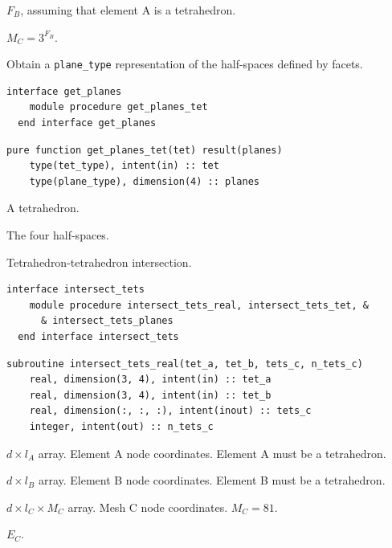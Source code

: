 \documentclass{article}
\begin{document}
\begin{description}[font=\ttfamily\bfseries,leftmargin=2.2\parindent,labelindent=1.7\parindent,noitemsep]
  \item[n\_planes\_b] $F_B$, assuming that element A is a tetrahedron.
  \item[max\_n\_tets\_c] $M_C = 3^{F_B}$.
\end{description}

\noindent Obtain a \verb+plane_type+ representation of the half-spaces defined
by facets.

\begin{lstlisting}[language=FORTRAN]
  interface get_planes
    module procedure get_planes_tet
  end interface get_planes
\end{lstlisting}
  
\begin{lstlisting}[language=FORTRAN]
  pure function get_planes_tet(tet) result(planes)
    type(tet_type), intent(in) :: tet
    type(plane_type), dimension(4) :: planes
\end{lstlisting}

\begin{description}[font=\ttfamily\bfseries,leftmargin=2.2\parindent,labelindent=1.7\parindent,noitemsep]
  \item[tet] A tetrahedron.
  \item[plane] The four half-spaces.
\end{description}

\noindent Tetrahedron-tetrahedron intersection.

\begin{lstlisting}[language=FORTRAN]
  interface intersect_tets
    module procedure intersect_tets_real, intersect_tets_tet, &
      & intersect_tets_planes
  end interface intersect_tets
\end{lstlisting}

\begin{lstlisting}[language=FORTRAN]
  subroutine intersect_tets_real(tet_a, tet_b, tets_c, n_tets_c)
    real, dimension(3, 4), intent(in) :: tet_a
    real, dimension(3, 4), intent(in) :: tet_b
    real, dimension(:, :, :), intent(inout) :: tets_c
    integer, intent(out) :: n_tets_c
\end{lstlisting}

\begin{description}[font=\ttfamily\bfseries,leftmargin=2.2\parindent,labelindent=1.7\parindent,noitemsep]
  \item[tet\_a] $d \times l_A$ array. Element A node coordinates. Element A must
    be a tetrahedron.
  \item[tet\_b] $d \times l_B$ array. Element B node coordinates. Element B must
    be a tetrahedron.
  \item[tets\_c] $d \times l_C \times M_C$ array. Mesh C node coordinates.
    $M_C = 81$.
  \item[n\_tets\_c] $E_C$.
\end{description}
\end{document}

